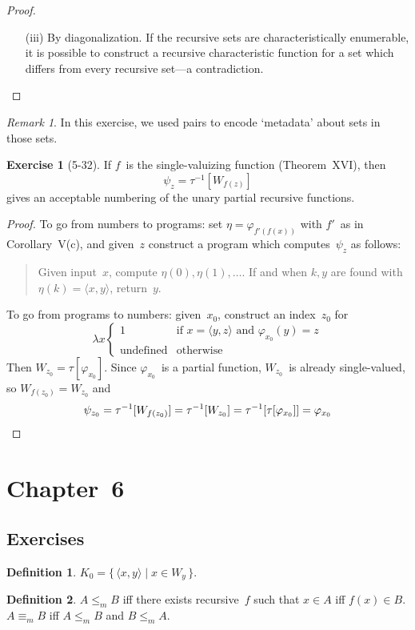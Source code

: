 \documentclass[letterpaper]{article}
\newcommand{\iso}{\equiv}
\newcommand{\pair}[2]{\langle{#1},{#2}\rangle}
\theoremstyle{definition}
\newtheorem*{defn}{Definition}
\newtheorem*{exer}{Exercise}
\theoremstyle{remark}
\newtheorem*{rmk}{Remark}
\theoremstyle{direction}
\begin{document}
\begin{proof}
\begin{enumerate}[itemsep=0pt]
\begin{enumerate}[itemsep=0pt]
\item[(iii)]
By diagonalization. If the recursive sets are characteristically enumerable, it is possible to construct a recursive characteristic function for a set which differs from every recursive set---a contradiction.\qedhere
\end{enumerate}
\end{enumerate}
\end{proof}
\begin{rmk}
In this exercise, we used pairs to encode `metadata' about sets in those sets.
\end{rmk}

\begin{exer}[5-32]
If $f$~is the single-valuizing function (Theorem~XVI), then
$$\psi_z=\tau^{-1}[W_{f(z)}]$$
gives an acceptable numbering of the unary partial recursive functions.
\end{exer}
\begin{proof}
To go from numbers to programs: set $\eta=\varphi_{f'(f(x))}$ with $f'$~as in Corollary~V(c), and given~$z$ construct a program which computes~$\psi_z$ as follows:
\begin{quote}
Given input~$x$, compute $\eta(0),\eta(1),\ldots$. If and when $k,y$ are found with $\eta(k)=\pair{x}{y}$, return~$y$.
\end{quote}
To go from programs to numbers: given~$x_0$, construct an index~$z_0$ for
$$\lambda x\begin{cases}
1&\text{if }x=\pair{y}{z}\text{ and }\varphi_{x_0}(y)=z\\
\text{undefined}&\text{otherwise}
\end{cases}$$
Then $W_{z_0}=\tau[\varphi_{x_0}]$. Since $\varphi_{x_0}$~is a partial function, $W_{z_0}$~is already single-valued, so $W_{f(z_0)}=W_{z_0}$ and
\begin{equation*}
\psi_{z_0}=\tau^{-1}[W_{f(z_0)}]=\tau^{-1}[W_{z_0}]=\tau^{-1}[\tau[\varphi_{x_0}]]=\varphi_{x_0}\qedhere
\end{equation*}
\end{proof}

\newpage
\section*{Chapter~6}
\subsection*{Exercises}
\begin{defn}
$K_0=\{\,\pair{x}{y}\mid x\in W_y\,\}$.
\end{defn}
\begin{defn}
$A\le_m B$ iff there exists recursive~$f$ such that $x\in A$ iff $f(x)\in B$. $A\iso_m B$ iff $A\le_m B$ and $B\le_m A$.
\end{defn}
\end{document}
